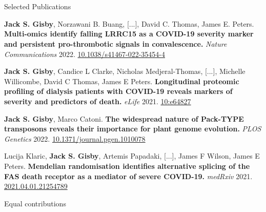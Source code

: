 \vspace{5pt}

\section{\faFlask}{Selected Publications}

\resumeEntryStart
    \item \textbf{Jack S. Gisby}\textsuperscript{\textdagger}, Norzawani B. Buang\textsuperscript{\textdagger}, [...], David C. Thomas\textsuperscript{\textdagger}, James E. Peters\textsuperscript{\textdagger}. \textbf{Multi-omics identify falling LRRC15 as a COVID-19 severity marker and persistent pro-thrombotic signals in convalescence.} \textit{Nature Communications} 2022. \href{https://doi.org/10.1038/s41467-022-35454-4}{10.1038/s41467-022-35454-4}
      
    \item \textbf{Jack S. Gisby}\textsuperscript{\textdagger}, Candice L Clarke\textsuperscript{\textdagger}, Nicholas Medjeral-Thomas\textsuperscript{\textdagger}, [...], Michelle Willicombe\textsuperscript{\textdagger}, David C Thomas\textsuperscript{\textdagger}, James E Peters\textsuperscript{\textdagger}. \textbf{Longitudinal proteomic profiling of dialysis patients with COVID-19 reveals markers of severity and predictors of death.} \textit{eLife} 2021. \href{https://doi.org/10.7554/eLife.64827}{10:e64827}
    
    \item \textbf{Jack S. Gisby}, Marco Catoni. \textbf{The widespread nature of Pack-TYPE transposons reveals their importance for plant genome evolution.} \textit{PLOS Genetics} 2022. \href{https://doi.org/10.1371/journal.pgen.1010078}{10.1371/journal.pgen.1010078}
    
    \item Lucija Klaric\textsuperscript{\textdagger}, \textbf{Jack S. Gisby}\textsuperscript{\textdagger}, Artemis Papadaki\textsuperscript{\textdagger}, [...], James F Wilson\textsuperscript{\textdagger}, James E Peters\textsuperscript{\textdagger}. \textbf{Mendelian randomisation identifies alternative splicing of the FAS death receptor as a mediator of severe COVID-19.} \textit{medRxiv} 2021. \href{https://doi.org/10.1101/2021.04.01.21254789 }{2021.04.01.21254789}
    
    \textdagger Equal contributions \hfill {}
    
